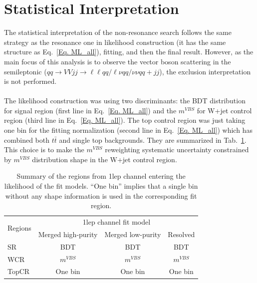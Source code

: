 \section{Statistical Interpretation}
The statistical interpretation of the non-resonance search follows the same strategy as the resonance one in likelihood construction (it has the same structure as Eq.~\ref{Eq. ML_all}), fitting, and then the final result. However, as the main focus of this analysis is to observe the vector boson scattering in the semileptonic ($qq\to VVjj \to \ell\ell qq/\ell\nu qq/\nu\nu qq +jj$), the exclusion interpretation is not performed. 
\\
\\The likelihood construction was using two discriminants: the BDT distribution for signal region (first line in Eq.~\ref{Eq. ML_all}) and the $m^{VBS}$ for W+jet control region (third line in Eq.~\ref{Eq. ML_all}). The top control region was just taking one bin for the fitting normalization (second line in Eq.~\ref{Eq. ML_all}) which has combined both $t\bar{t}$ and single top backgrounds. They are summarized in Tab.~\ref{tab:fitregions_1lep}. This choice is to make the $m^{VBS}$ reweighting systematic uncertainty constrained by $m^{VBS}$ distribution shape in the W+jet control region. 
\begin{table}[htb!]
	\centering
	\begin{tabular}{lccc}
		\toprule\midrule
		\multirow{2}{*}{Regions} & \multicolumn{3}{c}{1lep channel fit model} \\
		\cmidrule{2-4}
		& Merged high-purity & Merged low-purity & Resolved \\
		\midrule
		SR     & BDT & BDT & BDT \\
		WCR    & $m^{VBS}$& $m^{VBS}$ & $m^{VBS}$ \\
		TopCR  & One bin & One bin & One bin \\
		\midrule
		\bottomrule
	\end{tabular}
	\caption{\label{tab:fitregions_1lep} Summary of the regions from 1lep channel entering the likelihood of the fit models. 
		``One bin'' implies that a single bin without any shape information is used in the corresponding fit region.}
\end{table}

